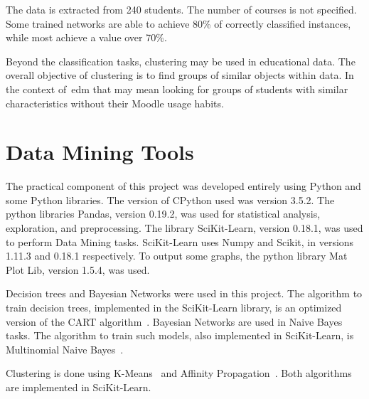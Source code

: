 The data is extracted from 240 students. The number of courses is not
specified. Some trained networks are able to achieve 80\% of correctly
classified instances, while most achieve a value over 70\%.

Beyond the classification tasks, clustering may be used in educational data.
The overall objective of clustering is to find groups of similar objects
within data. In the context of~\gls{edm} that may mean looking for groups of
students with similar characteristics without their Moodle usage habits.~\cite{ind_007,ind_008}

\section{Data Mining Tools}

The practical component of this project was developed entirely using Python and
some Python libraries. The version of CPython used was version 3.5.2. The
python libraries Pandas, version 0.19.2, was used for statistical analysis,
exploration, and preprocessing. The library SciKit-Learn, version 0.18.1, was
used to perform Data Mining tasks. SciKit-Learn uses Numpy and Scikit, in
versions 1.11.3 and 0.18.1 respectively. To output some graphs, the python
library Mat Plot Lib, version 1.5.4, was used.

Decision trees and Bayesian Networks were used in this project. The algorithm
to train decision trees, implemented in the SciKit-Learn library, is an
optimized version of the CART algorithm~\cite{web_scikit_trees}. Bayesian
Networks are used in Naive Bayes tasks. The algorithm to train such models,
also implemented in SciKit-Learn, is Multinomial Naive
Bayes~\cite{web_scikit_bayes}.

Clustering is done using K-Means~\cite{web_scikit_kmeans} and Affinity
Propagation~\cite{web_scikit_affinity}. Both algorithms are implemented in
SciKit-Learn.
